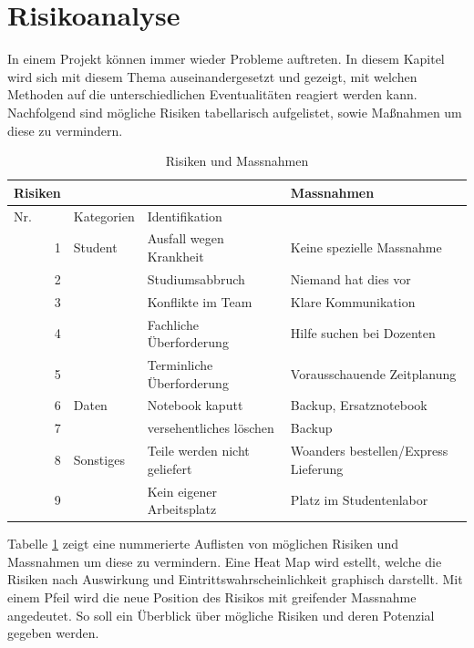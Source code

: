 \section{Risikoanalyse}
In einem Projekt können immer wieder Probleme auftreten. In diesem Kapitel wird sich mit diesem Thema auseinandergesetzt und gezeigt, mit welchen Methoden auf die unterschiedlichen Eventualitäten reagiert werden kann.
Nachfolgend sind mögliche Risiken tabellarisch aufgelistet, sowie Maßnahmen um diese zu vermindern.\\
\begin{table}[htbp]
  \centering
  \caption{Risiken und Massnahmen}
    \begin{tabular}{|r|r|l|l|}
    \toprule
    \multicolumn{1}{|l}{\textbf{Risiken}} & \multicolumn{1}{r}{} &       & \textbf{Massnahmen} \\
    \hline
    \multicolumn{1}{|l|}{Nr.} & \multicolumn{1}{l|}{Kategorien} & Identifikation &  \\
    \hline
    1     & \multicolumn{1}{l|}{Student} & Ausfall wegen Krankheit & Keine spezielle Massnahme \\
\cline{1-1}\cline{3-4}    2     &       & Studiumsabbruch & Niemand hat dies vor \\
\cline{1-1}\cline{3-4}    3     &       & Konflikte im Team & Klare Kommunikation \\
\cline{1-1}\cline{3-4}    4     &       & Fachliche Überforderung & Hilfe suchen bei Dozenten \\
\cline{1-1}\cline{3-4}    5     &       & Terminliche Überforderung & Vorausschauende Zeitplanung \\
    \hline
    6     & \multicolumn{1}{l|}{Daten} & Notebook kaputt & Backup, Ersatznotebook \\
\cline{1-1}\cline{3-4}    7     &       & versehentliches löschen & Backup \\
    \hline
    8     & \multicolumn{1}{l|}{Sonstiges} & Teile werden nicht geliefert & Woanders bestellen/Express Lieferung\\
\cline{1-1}\cline{3-4}    9     &       & Kein eigener Arbeitsplatz & Platz im Studentenlabor \\
    \bottomrule
    \end{tabular}%
  \label{tab:RisikenUndMassnahmen}%
\end{table}%

Tabelle \ref{tab:RisikenUndMassnahmen} zeigt eine nummerierte Auflisten von möglichen Risiken und Massnahmen um diese zu vermindern. Eine Heat Map wird estellt, welche die Risiken nach Auswirkung und Eintrittswahrscheinlichkeit graphisch darstellt. Mit einem Pfeil wird die neue Position des Risikos mit greifender Massnahme angedeutet. So soll ein Überblick über mögliche Risiken und deren Potenzial gegeben werden.\\

